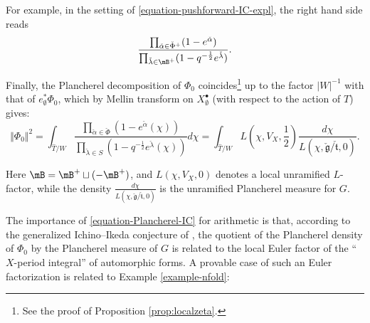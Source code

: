 \documentclass[final]{amsart}
\theoremstyle{remark}
\theoremstyle{definition}
\numberwithin{equation}{section}
\begin{document}
For example, in the setting of  \eqref{equation-pushforward-IC-expl}, the right hand side reads
\[\frac{\prod_{\check\alpha\in\check\Phi^+} (1- e^{\check\alpha})}{\prod_{\check\lambda \in \mB^+} (1-q^{-\frac{1}{2}} e^{\check\lambda})}.\]



Finally, the Plancherel decomposition of $\Phi_0$ coincides\footnote{See the proof of Proposition \ref{prop:localzeta}.} up to the factor $|W|^{-1}$ with that of $e_\emptyset^*\Phi_0$, which by Mellin transform on $X_\emptyset^\bullet$ (with respect to the action of $T$) gives:
\begin{equation}
 \label{equation-Plancherel-IC}
\Vert \Phi_0\Vert^2 = \int_{\hat T/W} \frac{\prod_{\check\alpha\in\check\Phi} (1- e^{\check\alpha}(\chi))}{\prod_{\check\lambda\in S} (1-q^{-\frac{1}{2}} e^{\check\lambda}(\chi))} d\chi = \int_{\hat T/W} L(\chi, V_X, \frac{1}{2}) \frac{d\chi}{L(\chi, \check{\mathfrak g}/\check{\mathfrak t},0)}.
\end{equation}

Here $\mB = \mB^+ \sqcup (-\mB^+)$, and  $L(\chi, V_X, 0)$ denotes a local unramified $L$-factor, while the density $\frac{d\chi}{L(\chi, \check{\mathfrak g}/\check{\mathfrak t},0)}$ is the unramified Plancherel measure for $G$. 

The importance of \eqref{equation-Plancherel-IC} for arithmetic is that, according to the generalized Ichino--Ikeda conjecture of \cite{SV}, the quotient of the Plancherel density of $\Phi_0$ by the Plancherel measure of $G$ is related to the local Euler factor of the ``$X$-period integral'' of automorphic forms. A provable case of such an Euler factorization is related to Example \ref{example-nfold}:
\end{document}
